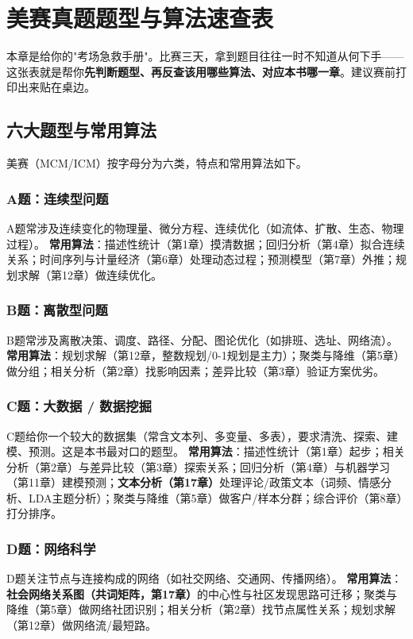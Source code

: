 \chapter{美赛真题题型与算法速查表}

本章是给你的"考场急救手册"。比赛三天，拿到题目往往一时不知道从何下手——这张表就是帮你\textbf{先判断题型、再反查该用哪些算法、对应本书哪一章}。建议赛前打印出来贴在桌边。

\section{六大题型与常用算法}

美赛（MCM/ICM）按字母分为六类，特点和常用算法如下。

\subsection{A题：连续型问题}
A题常涉及连续变化的物理量、微分方程、连续优化（如流体、扩散、生态、物理过程）。
\textbf{常用算法}：描述性统计（第1章）摸清数据；回归分析（第4章）拟合连续关系；时间序列与计量经济（第6章）处理动态过程；预测模型（第7章）外推；规划求解（第12章）做连续优化。

\subsection{B题：离散型问题}
B题常涉及离散决策、调度、路径、分配、图论优化（如排班、选址、网络流）。
\textbf{常用算法}：规划求解（第12章，整数规划/0-1规划是主力）；聚类与降维（第5章）做分组；相关分析（第2章）找影响因素；差异比较（第3章）验证方案优劣。

\subsection{C题：大数据 / 数据挖掘}
C题给你一个较大的数据集（常含文本列、多变量、多表），要求清洗、探索、建模、预测。这是本书最对口的题型。
\textbf{常用算法}：描述性统计（第1章）起步；相关分析（第2章）与差异比较（第3章）探索关系；回归分析（第4章）与机器学习（第11章）建模预测；\textbf{文本分析（第17章）}处理评论/政策文本（词频、情感分析、LDA主题分析）；聚类与降维（第5章）做客户/样本分群；综合评价（第8章）打分排序。

\subsection{D题：网络科学}
D题关注节点与连接构成的网络（如社交网络、交通网、传播网络）。
\textbf{常用算法}：\textbf{社会网络关系图（共词矩阵，第17章）}的中心性与社区发现思路可迁移；聚类与降维（第5章）做网络社团识别；相关分析（第2章）找节点属性关系；规划求解（第12章）做网络流/最短路。

